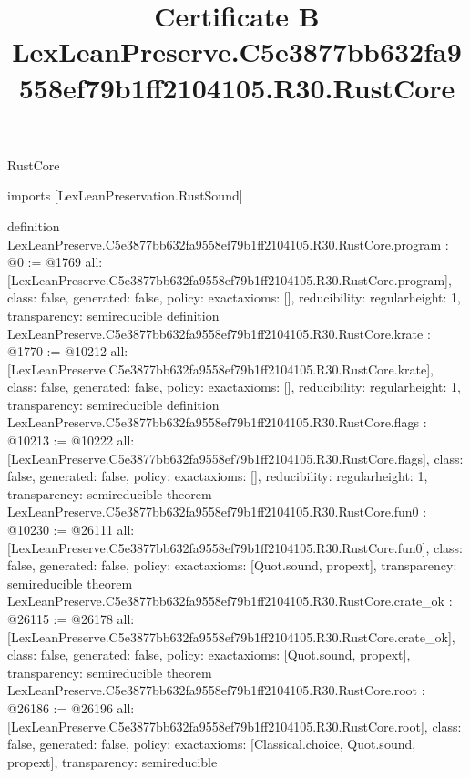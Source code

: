 \begin{lexlean}{RustCore}
\title{Certificate B LexLeanPreserve.C5e3877bb632fa9558ef79b1ff2104105.R30.RustCore}
\begin{coremodule}
imports [LexLeanPreservation.RustSound]

definition LexLeanPreserve.C5e3877bb632fa9558ef79b1ff2104105.R30.RustCore.program : @0 := @1769 {
  all: [LexLeanPreserve.C5e3877bb632fa9558ef79b1ff2104105.R30.RustCore.program],
  class: false,
  generated: false,
  policy: exact{axioms: []},
  reducibility: regular{height: 1},
  transparency: semireducible
}
definition LexLeanPreserve.C5e3877bb632fa9558ef79b1ff2104105.R30.RustCore.krate : @1770 := @10212 {
  all: [LexLeanPreserve.C5e3877bb632fa9558ef79b1ff2104105.R30.RustCore.krate],
  class: false,
  generated: false,
  policy: exact{axioms: []},
  reducibility: regular{height: 1},
  transparency: semireducible
}
definition LexLeanPreserve.C5e3877bb632fa9558ef79b1ff2104105.R30.RustCore.flags : @10213 := @10222 {
  all: [LexLeanPreserve.C5e3877bb632fa9558ef79b1ff2104105.R30.RustCore.flags],
  class: false,
  generated: false,
  policy: exact{axioms: []},
  reducibility: regular{height: 1},
  transparency: semireducible
}
theorem LexLeanPreserve.C5e3877bb632fa9558ef79b1ff2104105.R30.RustCore.fun0 : @10230 := @26111 {
  all: [LexLeanPreserve.C5e3877bb632fa9558ef79b1ff2104105.R30.RustCore.fun0],
  class: false,
  generated: false,
  policy: exact{axioms: [Quot.sound, propext]},
  transparency: semireducible
}
theorem LexLeanPreserve.C5e3877bb632fa9558ef79b1ff2104105.R30.RustCore.crate_ok : @26115 := @26178 {
  all: [LexLeanPreserve.C5e3877bb632fa9558ef79b1ff2104105.R30.RustCore.crate_ok],
  class: false,
  generated: false,
  policy: exact{axioms: [Quot.sound, propext]},
  transparency: semireducible
}
theorem LexLeanPreserve.C5e3877bb632fa9558ef79b1ff2104105.R30.RustCore.root : @26186 := @26196 {
  all: [LexLeanPreserve.C5e3877bb632fa9558ef79b1ff2104105.R30.RustCore.root],
  class: false,
  generated: false,
  policy: exact{axioms: [Classical.choice, Quot.sound, propext]},
  transparency: semireducible
}


\end{coremodule}
\end{lexlean}
